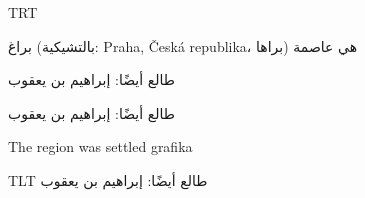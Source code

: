 \documentclass{article}
\begin{document}
\pokus


\pardir TRT


براغ (بالتشيكية: Praha, Česká republika، براها) هي عاصمة 

طالع أيضًا: إبراهيم بن يعقوب



\arab

طالع أيضًا: إبراهيم بن يعقوب

\libertine

The region was settled grafika %

\pardir TLT
\arab
طالع أيضًا: إبراهيم بن يعقوب

\end{document}
